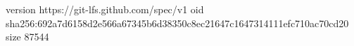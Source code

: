 version https://git-lfs.github.com/spec/v1
oid sha256:692a7d6158d2e566a67345b6d38350c8ec21647c1647314111efc710ac70cd20
size 87544
